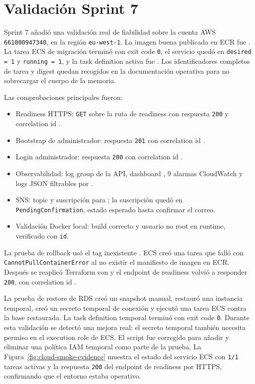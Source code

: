 \section{Validación Sprint 7}
\label{sec:validacion-sprint7}

Sprint 7 añadió una validación real de fiabilidad sobre la cuenta AWS \texttt{661000947340}, en la región \texttt{eu-west-1}. La imagen buena publicada en ECR fue . La tarea ECS de migración terminó con exit code \texttt{0}, el servicio quedó en \texttt{desired = 1} y \texttt{running = 1}, y la task definition activa fue . Los identificadores completos de tarea y digest quedan recogidos en la documentación operativa para no sobrecargar el cuerpo de la memoria.

Las comprobaciones principales fueron:

\begin{itemize}
  \item Readiness HTTPS: \texttt{GET} sobre la ruta de readiness con respuesta \texttt{200} y correlation id .
  \item Bootstrap de administrador: respuesta \texttt{201} con correlation id .
  \item Login administrador: respuesta \texttt{200} con correlation id .
  \item Observabilidad: log group de la API, dashboard , 9 alarmas CloudWatch y logs JSON filtrables por .
  \item SNS: topic y suscripción para ; la suscripción quedó en \texttt{PendingConfirmation}, estado esperado hasta confirmar el correo.
  \item Validación Docker local: build correcto y usuario no root en runtime, verificado con \texttt{id}.
\end{itemize}

La prueba de rollback usó el tag inexistente . ECS creó una tarea que falló con \texttt{CannotPullContainerError} al no existir el manifiesto de imagen en ECR. Después se reaplicó Terraform con  y el endpoint de readiness volvió a responder \texttt{200}, con correlation id .

La prueba de restore de RDS creó un snapshot manual, restauró una instancia temporal, creó un secreto temporal de conexión y ejecutó una tarea ECS  contra la base restaurada. La task definition temporal  terminó con exit code \texttt{0}. Durante esta validación se detectó una mejora real: el secreto temporal también necesita permiso  en el execution role de ECS. El script fue corregido para añadir y eliminar una política IAM temporal como parte de la prueba. La Figura~\ref{fig:cloud-smoke-evidence} muestra el estado del servicio ECS con \texttt{1/1} tareas activas y la respuesta \texttt{200} del endpoint de readiness por HTTPS, confirmando que el entorno estaba operativo.

